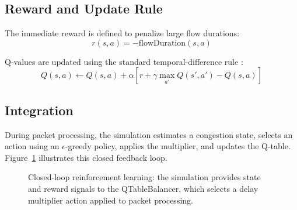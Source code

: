 \subsection{Reward and Update Rule}

The immediate reward is defined to penalize large flow durations:
\begin{equation}
r(s, a) = -\text{flowDuration}(s, a)
\end{equation}

Q-values are updated using the standard temporal-difference rule \cite{qlearning}:
\begin{equation}
Q(s, a) \leftarrow Q(s, a) + \alpha \left[r + \gamma \max_{a'} Q(s', a') - Q(s, a)\right]
\end{equation}

\subsection{Integration}

During packet processing, the simulation estimates a congestion state, selects an action using an $\epsilon$-greedy policy, applies the multiplier, and updates the Q-table. Figure~\ref{fig:rl_loop} illustrates this closed feedback loop.

\begin{figure}[H]
\centering
{}
\caption{Closed-loop reinforcement learning: the simulation provides state and reward signals to the QTableBalancer, which selects a delay multiplier action applied to packet processing.}
\label{fig:rl_loop}
\end{figure}

